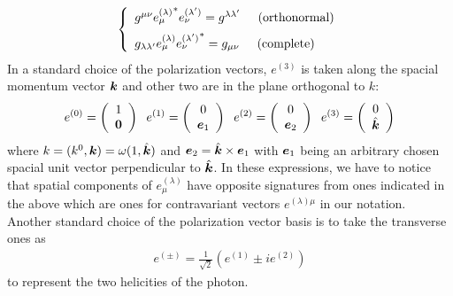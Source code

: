 \begin{eqnarray}
\left\{
\begin{array}{l}
g^{\mu \nu }{e_\mu^{(\lambda)}}^*   e_\nu^{(\lambda')}
=
g^{\lambda \lambda'}
\hspace{5mm}
\mbox{(orthonormal)}
\vspace{2mm}
\\
g_{\lambda \lambda'} e_\mu^{(\lambda)} {e_\nu^{(\lambda')}}^* 
= g_{\mu \nu}
\hspace{5mm}
\mbox{(complete)}
\end{array}
\right.
\end{eqnarray}
In a standard choice of the polarization vectors,
$e^{(3)}$ is taken along the spacial momentum vector $\mbox{\boldmath $k$}$ 
and other two are in the plane orthogonal to $k$:
\begin{eqnarray}
e^{(0)} =
\left(
\begin{array}{c}
1\\ \mbox{\boldmath $0$}
\end{array}
\right)
\hspace{2mm}
e^{(1)} =
\left(
\begin{array}{c}
0\\ \mbox{\boldmath $e$}_1
\end{array}
\right)
\hspace{2mm}
e^{(2)} =
\left(
\begin{array}{c}
0\\ \mbox{\boldmath $e$}_2
\end{array}
\right)
\hspace{2mm}
e^{(3)} =
\left(
\begin{array}{c}
0\\ \hat{\mbox{\boldmath $k$}}
\end{array}
\right)
\label{eqn:phopolvecstandardchoice}
\end{eqnarray}
where $k = (k^0, \mbox{\boldmath $k$}) = \omega (1, \hat{\mbox{\boldmath $k$}})$ and
$\mbox{\boldmath $e$}_2 = \hat{\mbox{\boldmath $k$}} \times \mbox{\boldmath $e$}_1$ with
$\mbox{\boldmath $e$}_1$ being an arbitrary chosen spacial unit vector perpendicular 
to $\hat{\mbox{\boldmath $k$}}$.
In these expressions, we have to notice that
spatial components of $e_\mu^{(\lambda)}$ have opposite
signatures from ones indicated in the above which are ones for
 contravariant vectors $e^{(\lambda)\mu}$ in our notation.
Another standard choice of the polarization vector basis is to take
the transverse ones as
\begin{eqnarray}
e^{(\pm)} = \frac{1}{\sqrt{2}} 
\left(
e^{(1)} \pm i e^{(2)}
\right)
\end{eqnarray}
to represent the two helicities of the photon.

